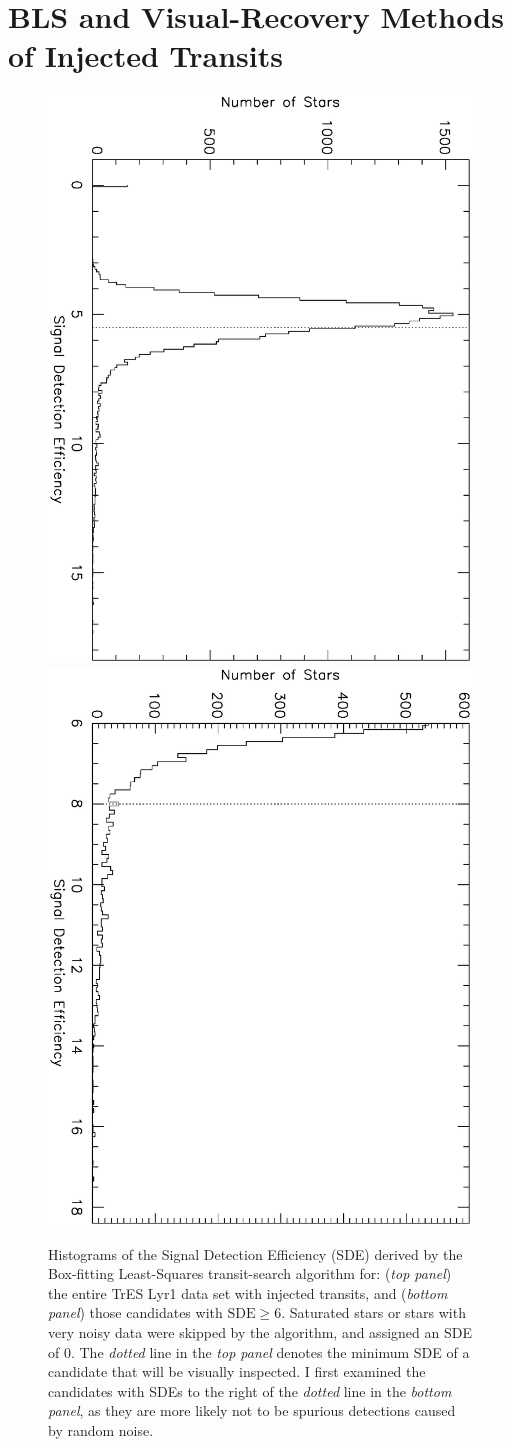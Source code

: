 \section{BLS and Visual-Recovery Methods of Injected Transits}
\label{cha:human:sec:rec}

\begin{figure}
\begin{center}
\centering
\includegraphics[width=.55\textwidth, angle=90]{7_sde_a}\\
\includegraphics[width=.55\textwidth, angle=90]{7_sde_b}\\
\caption[Histograms of BLS SDEs for fake data set]{%
Histograms of the Signal Detection Efficiency (SDE) derived by the Box-fitting Least-Squares transit-search algorithm for: %
({\it top panel}) the entire TrES Lyr1 data set with injected transits, and %
({\it bottom panel}) those candidates with $\mathrm{SDE}\geq6$.
Saturated stars or stars with very noisy data were skipped by the algorithm, and assigned an SDE of 0.
The {\it dotted} line in the {\it top panel} denotes the minimum SDE of a candidate that will be visually inspected.
I first examined the candidates with SDEs to the right of the {\it dotted} line in the {\it bottom panel}, as they are more likely not to be spurious detections caused by random noise.
}
\label{cha:human:sec:model:fig:sde}
\end{center}
\end{figure}


